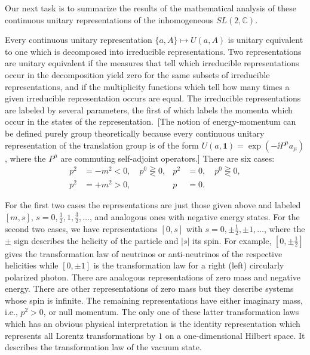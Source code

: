 Our next task is to summarize the results of the mathematical analysis of these
continuous unitary representations of the inhomogeneous $SL(2,\mathbb{C})$.

Every continuous unitary representation $\{a,A\}\mapsto U(a,A)$ is unitary
equivalent to one which is decomposed into irreducible representations. Two
representations are unitary equivalent if the measures that tell which
irreducible representations occur in the decomposition yield zero for the same
subsets of irreducible representations, and if the multiplicity functions which
tell how many times a given irreducible representation occurs are equal. The
irreducible representations are labeled by several parameters, the first of
which labels the momenta which occur in the states of the representation.
\,[The notion of energy-momentum can be defined purely group theoretically
because every continuous unitary representation of the translation group is of
the form $U(a,\mathbf{1})=\exp(-\ii P^\mu a_\mu)$, where the $P^\mu$ are commuting
self-adjoint operators.] There are six cases:
\begin{equation*}
\begin{aligned}
  p^2&=-m^2<0,\quad p^0\gtreqless0, &
  p^2&=0,\quad p^0\gtreqless0,\\
  p^2&=+m^2>0, & p&=0.
\end{aligned}
\end{equation*}

For the first two cases the representations are just those given above and
labeled $[m,s]$, $s=0,\tfrac12,1,\tfrac32,\ldots$, and analogous ones with
negative energy states. For the second two cases, we have representations
$[0,s]$ with $s=0,\pm\tfrac12,\pm1,\ldots$, where the $\pm$ sign describes
the helicity of the particle and $|s|$ its spin. For example,
$[0,\pm\tfrac12]$ gives the transformation law of neutrinos or
anti-neutrinos of the respective helicities while $[0,\pm1]$ is the
transformation law for a right (left) circularly polarized photon. There are
analogous representations of zero mass and negative energy. There are other
representations of zero mass but they describe systems whose spin is infinite.
The remaining representations have either imaginary mass, i.e., $p^2>0$, or
null momentum. The only one of these latter transformation laws which has an
obvious physical interpretation is the identity representation which represents
all Lorentz transformations by $1$ on a one-dimensional Hilbert space. It
describes the transformation law of the vacuum state.

